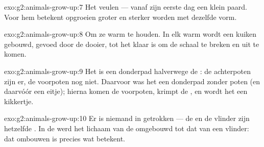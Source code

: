 \begin{solution}{exo:g2:animals-grow-up:7}
Het veulen --- vanaf zijn eerste dag een klein paard. Voor hem betekent
opgroeien groter en sterker worden met dezelfde vorm.
\end{solution}

\begin{solution}{exo:g2:animals-grow-up:8}
Om ze warm te houden. In elk warm  wordt een kuiken gebouwd, gevoed
door de dooier, tot het klaar is om de schaal te breken en uit te komen.
\end{solution}

\begin{solution}{exo:g2:animals-grow-up:9}
Het is een donderpad halverwege de : de
achterpoten zijn er, de voorpoten nog niet. Daarvoor was het een
donderpad zonder poten (en daarvóór een eitje); hierna komen de
voorpoten, krimpt de , en wordt het een kikkertje.
\end{solution}

\begin{solution}{exo:g2:animals-grow-up:10}
Er is niemand in getrokken --- de  en de vlinder zijn hetzelfde
. In de  werd het lichaam van de  omgebouwd tot dat van een
vlinder: dat ombouwen is precies wat  betekent.
\end{solution}
